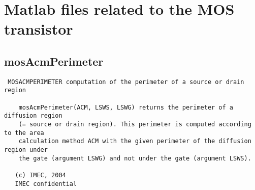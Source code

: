 \section{Matlab files related to the MOS transistor}
\subsection{mosAcmPerimeter}
\label{sec:mosAcmPerimeter}
\begin{verbatim}
 MOSACMPERIMETER computation of the perimeter of a source or drain region
 
    mosAcmPerimeter(ACM, LSWS, LSWG) returns the perimeter of a diffusion region
    (= source or drain region). This perimeter is computed according to the area 
    calculation method ACM with the given perimeter of the diffusion region under
    the gate (argument LSWG) and not under the gate (argument LSWS).
 
   (c) IMEC, 2004
   IMEC confidential 
 

\end{verbatim}

\newpage
